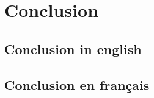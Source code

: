 \chapter*{Conclusion}


\section*{Conclusion in english}


\clearpage
\section*{Conclusion en français}

